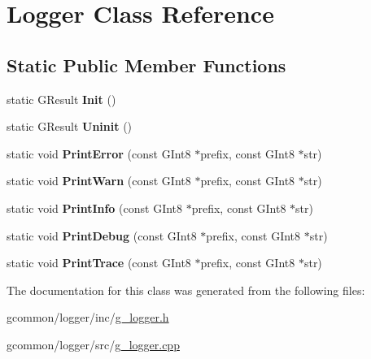 \hypertarget{class_logger}{\section{Logger Class Reference}
\label{class_logger}
}
\subsection*{Static Public Member Functions}
\begin{DoxyCompactItemize}
\item 
\hypertarget{class_logger_a1b6168857e3e4478453462fff7be7171}{static G\-Result {\bfseries Init} ()}\label{class_logger_a1b6168857e3e4478453462fff7be7171}

\item 
\hypertarget{class_logger_a6e10763cc0d1871a2faa39cb415a24d7}{static G\-Result {\bfseries Uninit} ()}\label{class_logger_a6e10763cc0d1871a2faa39cb415a24d7}

\item 
\hypertarget{class_logger_aa6b833a7cb6123b6d881f26268325fbe}{static void {\bfseries Print\-Error} (const G\-Int8 $\ast$prefix, const G\-Int8 $\ast$str)}\label{class_logger_aa6b833a7cb6123b6d881f26268325fbe}

\item 
\hypertarget{class_logger_a17033fe032cdf1982894f4130af72b92}{static void {\bfseries Print\-Warn} (const G\-Int8 $\ast$prefix, const G\-Int8 $\ast$str)}\label{class_logger_a17033fe032cdf1982894f4130af72b92}

\item 
\hypertarget{class_logger_a24852dbea580cf1a8f2d4a5f011e2211}{static void {\bfseries Print\-Info} (const G\-Int8 $\ast$prefix, const G\-Int8 $\ast$str)}\label{class_logger_a24852dbea580cf1a8f2d4a5f011e2211}

\item 
\hypertarget{class_logger_adee1a282dc6f7d28bc0d48c23bb79213}{static void {\bfseries Print\-Debug} (const G\-Int8 $\ast$prefix, const G\-Int8 $\ast$str)}\label{class_logger_adee1a282dc6f7d28bc0d48c23bb79213}

\item 
\hypertarget{class_logger_a77a49cac6e7ead50880ddf90f0900d23}{static void {\bfseries Print\-Trace} (const G\-Int8 $\ast$prefix, const G\-Int8 $\ast$str)}\label{class_logger_a77a49cac6e7ead50880ddf90f0900d23}

\end{DoxyCompactItemize}


The documentation for this class was generated from the following files\-:\begin{DoxyCompactItemize}
\item 
gcommon/logger/inc/\hyperlink{g__logger_8h}{g\-\_\-logger.\-h}\item 
gcommon/logger/src/\hyperlink{g__logger_8cpp}{g\-\_\-logger.\-cpp}\end{DoxyCompactItemize}
